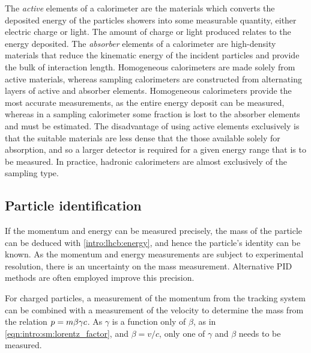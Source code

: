 The \emph{active} elements of a calorimeter are the materials which converts 
the deposited energy of the particles showers into some measurable quantity, 
either electric charge or light.
The amount of charge or light produced relates to the energy deposited.
The \emph{absorber} elements of a calorimeter are high-density materials that 
reduce the kinematic energy of the incident particles and provide the bulk of 
interaction length.
Homogeneous calorimeters are made solely from active materials, whereas 
sampling calorimeters are constructed from alternating layers of active and 
absorber elements.
Homogeneous calorimeters provide the most accurate measurements, as the entire 
energy deposit can be measured, whereas in a sampling calorimeter some fraction 
is lost to the absorber elements and must be estimated.
The disadvantage of using active elements exclusively is that the suitable 
materials are less dense that the those available solely for absorption, and so 
a larger detector is required for a given energy range that is to be measured.
In practice, hadronic calorimeters are almost exclusively of the sampling type.

\subsection{Particle identification}

If the momentum and energy can be measured precisely, the mass of the particle 
can be deduced with \cref{intro:lhcb:energy}, and hence the particle's identity 
can be known.
As the momentum and energy measurements are subject to experimental resolution, 
there is an uncertainty on the mass measurement.
Alternative \ac{PID} methods are often employed improve this precision.

For charged particles, a measurement of the momentum from the tracking system 
can be combined with a measurement of the velocity to determine the mass from 
the relation $p = m\beta\gamma c$.
As $\gamma$ is a function only of $\beta$, as in 
\cref{eqn:intro:sm:lorentz_factor}, and $\beta = v/c$, only one of $\gamma$ and 
$\beta$ needs to be measured.

